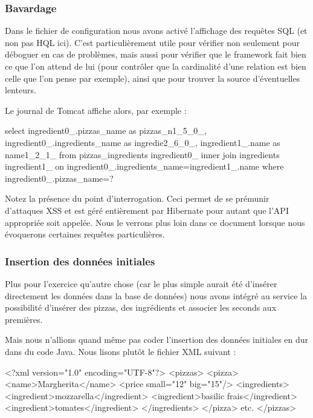 \subsubsection{Bavardage}

Dans le fichier de configuration nous avons activé l'affichage des requêtes SQL (et non pas HQL ici). 
C'est particulièrement utile pour vérifier non seulement pour déboguer en cas de problèmes, mais
aussi pour vérifier que le framework fait bien ce que l'on attend de lui (pour contrôler que la cardinalité 
d'une relation est bien celle que l'on pense par exemple), ainsi que pour trouver la source
d'éventuelles lenteurs.

Le journal de Tomcat affiche alors, par exemple :

\begin{sqlcode}
    select
        ingredient0_.pizzas_name as pizzas_n1_5_0_,
        ingredient0_.ingredients_name as ingredie2_6_0_,
        ingredient1_.name as name1_2_1_ 
    from
        pizzas_ingredients ingredient0_ 
    inner join
        ingredients ingredient1_ 
            on ingredient0_.ingredients_name=ingredient1_.name 
    where
        ingredient0_.pizzas_name=?
\end{sqlcode}

Notez la présence du point d'interrogation. Ceci permet de se prémunir d'attaques XSS et est géré entièrement
par Hibernate pour autant que l'API appropriée soit appelée. Nous le verrons plus loin dans ce document  lorsque
nous évoquerons certaines requêtes particulières.

\subsubsection{Insertion des données initiales}

Plus pour l'exercice qu'autre chose (car le plus simple aurait été d'insérer directement les données
dans la base de données) nous avons intégré au service la possibilité d'insérer des pizzas, des ingrédients
et associer les seconds aux premières.

Mais nous n'allions quand même pas coder l'insertion des données initiales en dur dans du code Java.
Nous lisons plutôt le fichier XML suivant :

\begin{xmlcode}
<?xml version="1.0" encoding="UTF-8"?>
<pizzas>
    <pizza>
        <name>Margherita</name>
        <price small="12" big="15"/>
        <ingredients>
            <ingredient>mozzarella</ingredient>
            <ingredient>basilic frais</ingredient>
            <ingredient>tomates</ingredient>
        </ingredients>
    </pizza>
    etc.
</pizzas>
\end{xmlcode}

